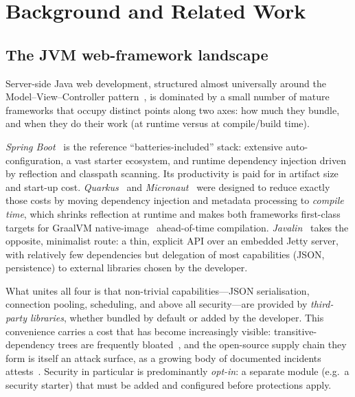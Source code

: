 \section{Background and Related Work}\label{sec:related}

\subsection{The JVM web-framework landscape}

Server-side Java web development, structured almost universally around
the Model--View--Controller pattern~\cite{krasner1988}, is dominated by
a small number of mature frameworks that occupy distinct points along
two axes: how much they bundle, and when they do their work (at runtime
versus at compile/build time).

\emph{Spring Boot}~\cite{springboot} is the reference
``batteries-included'' stack: extensive auto-configuration, a vast
starter ecosystem, and runtime dependency injection driven by
reflection and classpath scanning. Its productivity is paid for in
artifact size and start-up cost. \emph{Quarkus}~\cite{quarkus} and
\emph{Micronaut}~\cite{micronaut} were designed to reduce exactly those
costs by moving dependency injection and metadata processing to
\emph{compile time}, which shrinks reflection at runtime and makes both
frameworks first-class targets for GraalVM native-image~\cite{graalvm,wimmer2019}
ahead-of-time compilation. \emph{Javalin}~\cite{javalin} takes the
opposite, minimalist route: a thin, explicit API over an embedded
Jetty server, with relatively few dependencies but delegation of most
capabilities (JSON, persistence) to external libraries chosen by the
developer.

What unites all four is that non-trivial capabilities---JSON
serialisation, connection pooling, scheduling, and above all
security---are provided by \emph{third-party libraries}, whether
bundled by default or added by the developer. This convenience carries
a cost that has become increasingly visible: transitive-dependency
trees are frequently bloated~\cite{sotovalero2021}, and the open-source
supply chain they form is itself an attack surface, as a growing body
of documented incidents attests~\cite{ohm2020}. Security in particular
is predominantly \emph{opt-in}: a separate module (e.g.\ a security
starter) that must be added and configured before protections apply.

